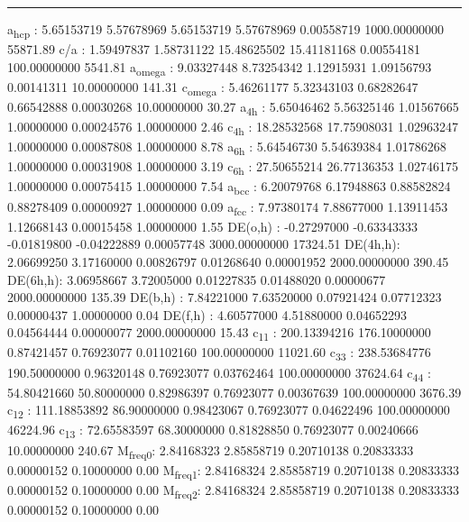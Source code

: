 \documentclass[11pt]{article}
\begin{document}
\noindent\rule{\textwidth}{0.5pt}
a\textsubscript{hcp}   :   5.65153719   5.57678969   5.65153719   5.57678969   0.00558719 1000.00000000     55871.89
c/a     :   1.59497837   1.58731122  15.48625502  15.41181168   0.00554181 100.00000000      5541.81
a\textsubscript{omega} :   9.03327448   8.73254342   1.12915931   1.09156793   0.00141311  10.00000000       141.31
c\textsubscript{omega} :   5.46261177   5.32343103   0.68282647   0.66542888   0.00030268  10.00000000        30.27
a\textsubscript{4h}    :   5.65046462   5.56325146   1.01567665   1.00000000   0.00024576   1.00000000         2.46
c\textsubscript{4h}    :  18.28532568  17.75908031   1.02963247   1.00000000   0.00087808   1.00000000         8.78
a\textsubscript{6h}    :   5.64546730   5.54639384   1.01786268   1.00000000   0.00031908   1.00000000         3.19
c\textsubscript{6h}    :  27.50655214  26.77136353   1.02746175   1.00000000   0.00075415   1.00000000         7.54
a\textsubscript{bcc}   :   6.20079768   6.17948863   0.88582824   0.88278409   0.00000927   1.00000000         0.09
a\textsubscript{fcc}   :   7.97380174   7.88677000   1.13911453   1.12668143   0.00015458   1.00000000         1.55
DE(o,h) :  -0.27297000  -0.63343333  -0.01819800  -0.04222889   0.00057748 3000.00000000     17324.51
DE(4h,h):   2.06699250   3.17160000   0.00826797   0.01268640   0.00001952 2000.00000000       390.45
DE(6h,h):   3.06958667   3.72005000   0.01227835   0.01488020   0.00000677 2000.00000000       135.39
DE(b,h) :   7.84221000   7.63520000   0.07921424   0.07712323   0.00000437   1.00000000         0.04
DE(f,h) :   4.60577000   4.51880000   0.04652293   0.04564444   0.00000077 2000.00000000        15.43
c\textsubscript{11}    : 200.13394216 176.10000000   0.87421457   0.76923077   0.01102160 100.00000000     11021.60
c\textsubscript{33}    : 238.53684776 190.50000000   0.96320148   0.76923077   0.03762464 100.00000000     37624.64
c\textsubscript{44}    :  54.80421660  50.80000000   0.82986397   0.76923077   0.00367639 100.00000000      3676.39
c\textsubscript{12}    : 111.18853892  86.90000000   0.98423067   0.76923077   0.04622496 100.00000000     46224.96
c\textsubscript{13}    :  72.65583597  68.30000000   0.81828850   0.76923077   0.00240666  10.00000000       240.67
M\textsubscript{freq}\textsubscript{0}:   2.84168323   2.85858719   0.20710138   0.20833333   0.00000152   0.10000000         0.00
M\textsubscript{freq}\textsubscript{1}:   2.84168324   2.85858719   0.20710138   0.20833333   0.00000152   0.10000000         0.00
M\textsubscript{freq}\textsubscript{2}:   2.84168324   2.85858719   0.20710138   0.20833333   0.00000152   0.10000000         0.00
\end{document}
